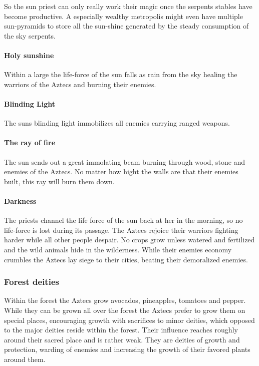 So the sun priest can only really work their magic once the serpents stables
have become productive. A especially wealthy metropolis might even have
multiple sun-pyramids to store all the sun-shine generated by the steady
consumption of the sky serpents.

\paragraph{Holy sunshine}
Within a large the life-force of the sun falls as rain from the sky healing the
warriors of the \gls{Aztecs} and burning their enemies.

\paragraph{Blinding Light}
The suns blinding light immobilizes all enemies carrying ranged weapons.

\paragraph{The ray of fire}
The sun sends out a great immolating beam burning through wood, stone and
enemies of the \gls{Aztecs}. No matter how hight the walls are that their
enemies built, this ray will burn them down.

\paragraph{Darkness}
The priests channel the life force of the sun back at her in the morning, so no
life-force is lost during its passage. The \gls{Aztecs} rejoice their warriors
fighting harder while all other people despair. No crops grow unless watered
and fertilized and the wild animals hide in the wilderness. While their enemies
economy crumbles the \gls{Aztecs} lay siege to their cities, beating their
demoralized enemies.

\subsubsection{Forest deities}
Within the forest the \gls{Aztecs} grow avocados, pineapples, tomatoes and
pepper. While they can be grown all over the forest the \gls{Aztecs} prefer to
grow them on special places, encouraging growth with sacrifices to minor
deities, which opposed to the major deities reside within the forest. Their
influence reaches roughly around their sacred place and is rather weak. They
are deities of growth and protection, warding of enemies and increasing the
growth of their favored plants around them.

